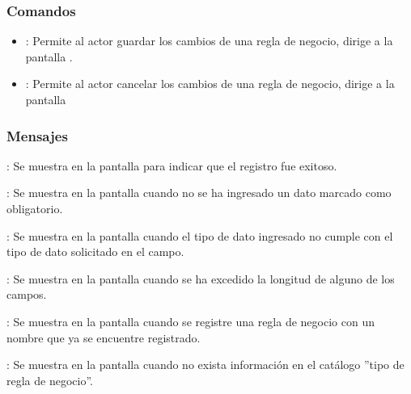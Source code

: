 \subsubsection{Comandos}
\begin{itemize}
	\item {}: Permite al actor guardar los cambios de una regla de negocio, dirige a la pantalla .
	\item {}: Permite al actor cancelar los cambios de una regla de negocio, dirige a la pantalla 
\end{itemize}

\subsubsection{Mensajes}

\begin{Citemize}
	\item {}: Se muestra en la pantalla  para indicar que el registro fue exitoso.
	\item {}: Se muestra en la pantalla  cuando no se ha ingresado un dato marcado como obligatorio.
	\item {}: Se muestra en la pantalla  cuando el tipo de dato ingresado no cumple con el tipo de dato solicitado en el campo.
	\item {}: Se muestra en la pantalla  cuando se ha excedido la longitud de alguno de los campos.
	\item {}: Se muestra en la pantalla  cuando se registre una regla de negocio con un nombre que ya se encuentre registrado.
	\item {}: Se muestra en la pantalla  cuando no exista información en el catálogo ''tipo de regla de negocio''.
\end{Citemize}
